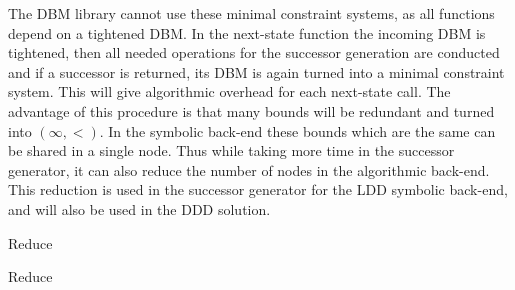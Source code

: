 The DBM library cannot use these minimal constraint systems, as all functions depend on a tightened DBM. In the next-state function the incoming DBM is tightened, then all needed operations for the successor generation are conducted and if a successor is returned, its DBM is again turned into a minimal constraint system. This will give algorithmic overhead for each next-state call. The advantage of this procedure is that many bounds will be redundant and turned into $(\infty,<)$. In the symbolic back-end these bounds which are the same can be shared in a single node. Thus while taking more time in the successor generator, it can also reduce the number of nodes in the algorithmic back-end. This reduction is used in the successor generator for the LDD symbolic back-end, and will also be used in the DDD solution.

\begin{algorithm}
\caption{Reduce}\label{alg:Reduce}
\begin{algorithmic}[1]
					\EndIf
				\EndIf
			\EndFor
		\EndFor
	\EndFor				
\EndProcedure
\end{algorithmic}
\end{algorithm}

\begin{algorithm}
\caption{Reduce}\label{alg:ReduceZero}
\begin{algorithmic}[1]
				\EndIf
			\EndFor
		\EndIf
	\EndFor
				\Break
			\EndIf
		\EndFor
	\EndFor
		\EndFor
	\EndFor
					\EndIf
				\EndFor
			\EndIf
		\EndFor
		\EndFor
	\EndFor
		
\EndProcedure
\end{algorithmic}
\end{algorithm}



